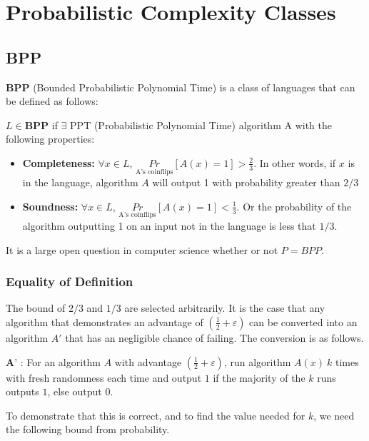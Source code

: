 \documentclass[11pt]{article}
\begin{document}
\section{Probabilistic Complexity Classes}
\subsection{BPP}
\textbf{BPP} (Bounded Probabilistic Polynomial Time) is a class of languages that can be defined as follows:
\vspace{1em}

$L \in \textbf{BPP}$ if $\exists$ PPT (Probabilistic Polynomial Time) algorithm A with the following properties:
\begin{itemize}
    \item \textbf{Completeness:} $\forall x \in L$, $\underset{\text{A's coinflips}}{Pr}$$[A(x) = 1] > \frac{2}{3}$. In other words, if $x$ is in the language, algorithm $A$ will output 1 with probability greater than $2/3$
    \item \textbf{Soundness:} $\forall x \in L$, $\underset{\text{A's coinflips}}{Pr}$$[A(x) = 1] < \frac{1}{3}$. Or the probability of the algorithm outputting 1 on an input not in the language is less that $1/3$.
\end{itemize}
It is a large open question in computer science whether or not $P = BPP$.
\subsubsection{Equality of Definition}
The bound of $2/3$ and $1/3$ are selected arbitrarily. It is the case that any algorithm that demonstrates an advantage of $(\frac{1}{2} + \varepsilon)$ can be converted into an algorithm $A'$ that has an negligible chance of failing. The conversion is as follows.
\vspace{1em}

$\textbf{A'}$ : For an algorithm $A$ with advantage $(\frac{1}{2} + \varepsilon)$, run algorithm $A(x) \ k$ times with fresh randomness each time and output $1$ if the majority of the $k$ runs outputs $1$, else output $0$.
\vspace{1em}

To demonstrate that this is correct, and to find the value needed for $k$, we need the following bound from probability.
\vspace{1em}
\end{document}
